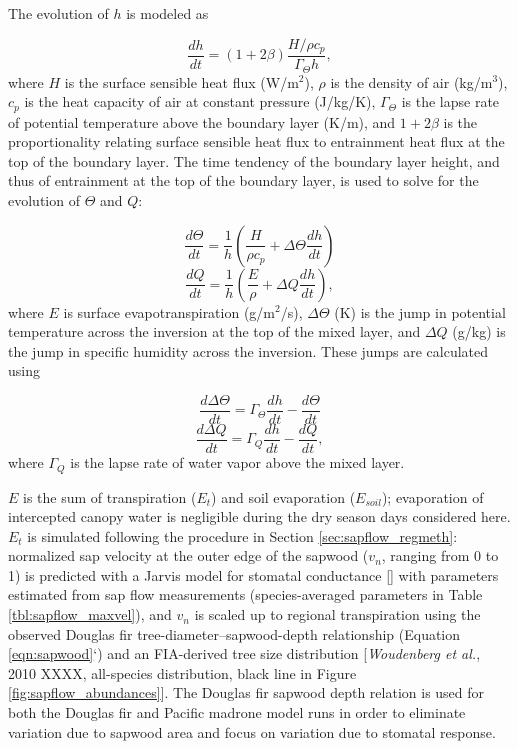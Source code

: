 The evolution of $h$ is modeled as

\begin{equation}
\frac{dh}{dt} = (1+2\beta)\frac{H/\rho c_p}{\Gamma_\Theta h},
\label{eqn:dhdt}
\end{equation}
where $H$ is the surface sensible heat flux (W/m$^2$), $\rho$ is the density of air (kg/m$^3$), $c_p$ is the heat capacity of air at constant pressure (J/kg/K), $\Gamma_\Theta$ is the lapse rate of potential temperature above the boundary layer (K/m), and $1+2\beta$ is the proportionality relating surface sensible heat flux to entrainment heat flux at the top of the boundary layer.  The time tendency of the boundary layer height, and thus of entrainment at the top of the boundary layer, is used to solve for the evolution of $\Theta$ and $Q$:

\begin{equation}
\frac{d\Theta}{dt} = \frac{1}{h}\left(\frac{H}{\rho c_p}+\Delta\Theta\frac{dh}{dt}\right)
\label{eqn:dTdt}
\end{equation}
\begin{equation}
\frac{dQ}{dt} = \frac{1}{h}\left(\frac{E}{\rho}+\Delta Q \frac{dh}{dt}\right),
\label{eqn:dQdt}
\end{equation}
where $E$ is surface evapotranspiration (g/m$^2$/s), $\Delta\Theta$ (K) is the jump in potential temperature across the inversion at the top of the mixed layer, and $\Delta Q$ (g/kg) is the jump in specific humidity across the inversion.  These jumps are calculated using

\begin{equation}
\frac{d\Delta\Theta}{dt} = \Gamma_\Theta\frac{dh}{dt}-\frac{d\Theta}{dt}
\label{eqn:dDTdt}
\end{equation}
\begin{equation}
\frac{d\Delta Q}{dt} = \Gamma_Q\frac{dh}{dt}-\frac{dQ}{dt},
\label{eqn:dDQdt}
\end{equation}
where $\Gamma_Q$ is the lapse rate of water vapor above the mixed layer.

$E$ is the sum of transpiration ($E_t$) and soil evaporation ($E_{soil}$); evaporation of intercepted canopy water is negligible during the dry season days considered here.  $E_t$ is simulated following the procedure in Section \ref{sec:sapflow_regmeth}: normalized sap velocity at the outer edge of the sapwood ($v_n$, ranging from 0 to 1) is predicted with a Jarvis model for stomatal conductance [\cite{jarvis1976interpretation}] with parameters estimated from sap flow measurements (species-averaged parameters in Table \ref{tbl:sapflow_maxvel}), and $v_n$ is scaled up to regional transpiration using the observed Douglas fir tree-diameter--sapwood-depth relationship (Equation \ref{eqn:sapwood}`) and an FIA-derived tree size distribution [\textit{Woudenberg et al.}, 2010 XXXX, all-species distribution, black line in Figure \ref{fig:sapflow_abundances}].  The Douglas fir sapwood depth relation is used for both the Douglas fir and Pacific madrone model runs in order to eliminate variation due to sapwood area and focus on variation due to stomatal response.

